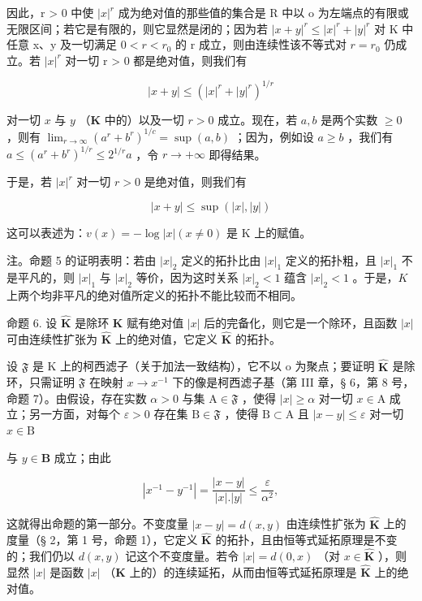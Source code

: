 因此，r \textgreater{} 0 中使 \(|x|^{r}\) 成为绝对值的那些值的集合是 R 中以 o 为左端点的有限或无限区间；若它是有限的，则它显然是闭的；因为若 \(|x + y|^{r} \leqslant |x|^{r} + |y|^{r}\) 对 K 中任意 x、y 及一切满足 \(0 < r < r_{0}\) 的 r 成立，则由连续性该不等式对 \(r = r_{0}\) 仍成立。若 \(|x|^{r}\) 对一切 r \textgreater{} 0 都是绝对值，则我们有

\[
| x + y | \leqslant (| x | ^ {r} + | y | ^ {r}) ^ {1 / r}
\]

对一切 \(x\) 与 \(y\) （\(\mathbf{K}\) 中的）以及一切 \(r > 0\) 成立。现在，若 \(a, b\) 是两个实数 \(\geqslant 0\) ，则有 \(\lim_{r \to \infty} (a^r + b^r)^{1/c} = \sup (a, b)\) ；因为，例如设 \(a \geqslant b\) ，我们有 \(a \leqslant (a^r + b^r)^{1/r} \leqslant 2^{1/r} a\) ，令 \(r \to +\infty\) 即得结果。

于是，若 \(|x|^r\) 对一切 \(r > 0\) 是绝对值，则我们有

\[
| x + y | \leqslant \sup (| x |, | y |)
\]

这可以表述为：\(v(x) = -\log |x| (x \neq 0)\) 是 K 上的赋值。

注。命题 5 的证明表明：若由 \(|x|_2\) 定义的拓扑比由 \(|x|_1\) 定义的拓扑粗，且 \(|x|_1\) 不是平凡的，则 \(|x|_1\) 与 \(|x|_2\) 等价，因为这时关系 \(|x|_2 < 1\) 蕴含 \(|x|_2 < 1\) 。于是，\(K\) 上两个均非平凡的绝对值所定义的拓扑不能比较而不相同。

命题 6. 设 \(\hat{\mathbf{K}}\) 是除环 \(\mathbf{K}\) 赋有绝对值 \(|x|\) 后的完备化，则它是一个除环，且函数 \(|x|\) 可由连续性扩张为 \(\hat{\mathbf{K}}\) 上的绝对值，它定义 \(\hat{\mathbf{K}}\) 的拓扑。

设 \(\mathfrak{F}\) 是 K 上的柯西滤子（关于加法一致结构），它不以 o 为聚点；要证明 \(\hat{\mathbf{K}}\) 是除环，只需证明 \(\mathfrak{F}\) 在映射 \(x \to x^{-1}\) 下的像是柯西滤子基（第 III 章，§ 6，第 8 号，命题 7）。由假设，存在实数 \(\alpha > 0\) 与集 \(\mathrm{A} \in \mathfrak{F}\) ，使得 \(|x| \geqslant \alpha\) 对一切 \(x \in \mathrm{A}\) 成立；另一方面，对每个 \(\varepsilon > 0\) 存在集 \(\mathrm{B} \in \mathfrak{F}\) ，使得 \(\mathrm{B} \subset \mathrm{A}\) 且 \(|x - y| \leqslant \varepsilon\) 对一切 \(x \in \mathrm{B}\)

与 \(y\in \mathbf{B}\) 成立；由此

\[
\left| x ^ {- 1} - y ^ {- 1} \right| = \frac {\left| x - y \right|}{\left| x \right| . \left| y \right|} \leqslant \frac {\varepsilon}{\alpha^ {2}},
\]

这就得出命题的第一部分。不变度量 \(|x - y| = d(x, y)\) 由连续性扩张为 \(\hat{\mathbf{K}}\) 上的度量（§ 2，第 1 号，命题 1），它定义 \(\hat{\mathbf{K}}\) 的拓扑，且由恒等式延拓原理是不变的；我们仍以 \(d(x, y)\) 记这个不变度量。若令 \(|x| = d(0, x)\) （对 \(x \in \hat{\mathbf{K}}\) ），则显然 \(|x|\) 是函数 \(|x|\) （\(\mathbf{K}\) 上的）的连续延拓，从而由恒等式延拓原理是 \(\hat{\mathbf{K}}\) 上的绝对值。

